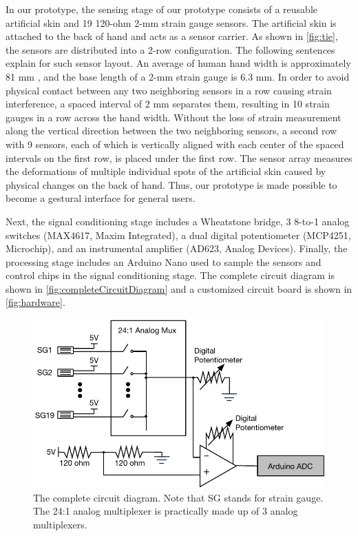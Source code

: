 \documentclass{sigchi}
\begin{document}
In our prototype, the sensing stage of our prototype consists of a reusable artificial skin and 19 120-ohm 2-mm strain gauge sensors. The artificial skin is attached to the back of hand and acts as a sensor carrier. As shown in \autoref{fig:tie}, the sensors are distributed into a 2-row configuration. The following sentences explain for such sensor layout. An average of human hand width is approximately 81 mm \cite{Kulaksiz2002257}, and the base length of a 2-mm strain gauge is 6.3 mm. In order to avoid physical contact between any two neighboring sensors in a row causing strain interference, a spaced interval of 2 mm separates them, resulting in 10 strain gauges in a row across the hand width. Without the loss of strain measurement along the vertical direction between the two neighboring sensors, a second row with 9 sensors, each of which is vertically aligned with each center of the spaced intervals on the first row, is placed under the first row. The sensor array measures the deformations of multiple individual spots of the artificial skin caused by physical changes on the back of hand. Thus, our prototype is made possible to become a gestural interface for general users.

Next, the signal conditioning stage includes a Wheatstone bridge, 3 8-to-1 analog switches (MAX4617, Maxim Integrated), a dual digital potentiometer (MCP4251, Microchip), and an instrumental amplifier (AD623, Analog Devices). Finally, the processing stage includes an Arduino Nano used to sample the sensors and control chips in the signal conditioning stage. The complete circuit diagram is shown in \autoref{fig:completeCircuitDiagram} and a customized circuit board is shown in \autoref{fig:hardware}.

\begin{figure}
  \includegraphics[width=1\columnwidth]{figures/CompleteDiagram_v2.pdf}
  \caption{The complete circuit diagram. Note that SG stands for strain gauge. The 24:1 analog multiplexer is practically made up of 3 analog multiplexers.}
  \label{fig:completeCircuitDiagram}
\end{figure}
\end{document}
